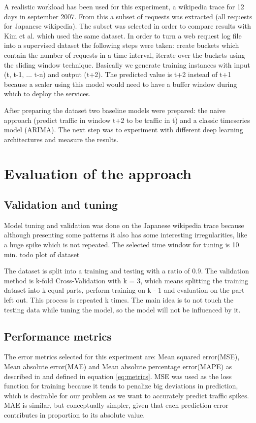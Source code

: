 \documentclass[12pt]{article}
\begin{document}
  A realistic workload has been used for this experiment, a wikipedia 
  trace for 12 days in september 2007. From this a subset of requests was 
  extracted (all requests for Japanese wikipedia). The subset was selected 
  in order to compare results with Kim et al.\cite{CloudInsight} which used 
  the same dataset. In order to turn a web request log file into a supervised 
  dataset the following steps were taken: create buckets which contain the 
  number of requests in a time interval, iterate over the buckets using 
  the sliding window technique\cite{sliding_window}. Basically we generate 
  training instances with input (t, t-1, ... t-n) and output (t+2). The 
  predicted value is t+2 instead of t+1 because a scaler using this model 
  would need to have a buffer window during which to deploy the services.

  After preparing the dataset two baseline models were prepared: the naive 
  approach (predict traffic in window t+2 to be traffic in t) and a classic 
  timeseries model (ARIMA). The next step was to experiment with different 
  deep learning architectures and measure the results.


  \section{Evaluation of the approach}
  \subsection{Validation and tuning}
  Model tuning and validation was done on the Japanese wikipedia trace because 
  although presenting some patterns it also has some interesting irregularities, 
  like a huge spike which is not repeated. The selected time window for tuning 
  is 10 min. todo plot of dataset

  The dataset is split into a training and testing with a ratio of 0.9.
  The validation method is k-fold Cross-Validation\cite{kfold} with k = 3, 
  which means splitting the training dataset into k equal parts, perform training
  on k - 1 and evaluation on the part left out. This process is repeated k times.
  The main idea is to not touch the testing data while tuning the model, so the 
  model will not be influenced by it.

  \subsection{Performance metrics}
  The error metrics selected for this experiment are: 
  Mean squared error(MSE), Mean absolute error(MAE)
  and Mean absolute percentage error(MAPE) as described in \cite{error_metrics} and defined in equation \ref{eq:metrics}. MSE was used as the 
  loss function for training because it tends to penalize big deviations in prediction, which is desirable for 
  our problem as we want to accurately predict traffic spikes. MAE is similar, but conceptually simpler, 
  given that each prediction error contributes in proportion to its absolute value. 
  
\end{document}
